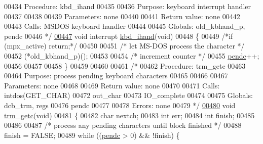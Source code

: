 \begin{DoxyCode}
00434 \textcolor{comment}{        Procedure: kbd\_ihand}
00435 \textcolor{comment}{}
00436 \textcolor{comment}{        Purpose: keyboard interrupt handler}
00437 \textcolor{comment}{}
00438 \textcolor{comment}{}
00439 \textcolor{comment}{        Parameters: none        }
00440 \textcolor{comment}{}
00441 \textcolor{comment}{        Return value: none}
00442 \textcolor{comment}{}
00443 \textcolor{comment}{        Calls:  MSDOS keyboard handler}
00444 \textcolor{comment}{}
00445 \textcolor{comment}{        Globals: old\_kbhand\_p, pendc}
00446 \textcolor{comment}{*/}
\hypertarget{trmdrive_8c_source_l00447}{}\hyperlink{trmdrive_8c_aebfcd164b5b67675c3d7f86be3f68e94}{00447} \textcolor{keywordtype}{void} interrupt \hyperlink{trmdrive_8c_aebfcd164b5b67675c3d7f86be3f68e94}{kbd_ihand}(\textcolor{keywordtype}{void})
00448 \{
00449         \textcolor{comment}{/*if (mpx\_active) return;*/}
00450 
00451         \textcolor{comment}{/* let MS-DOS process the character */}
00452         (*old\_kbhand\_p)();
00453 
00454         \textcolor{comment}{/* increment counter */}
00455         \hyperlink{trmdrive_8c_a152186ebee09ccf193037184a35ae013}{pendc}++;
00456 
00457 
00458 \}
00459 
00460 
00461 \textcolor{comment}{/*}
00462 \textcolor{comment}{        Procedure: trm\_getc}
00463 \textcolor{comment}{}
00464 \textcolor{comment}{        Purpose: process pending keyboard characters}
00465 \textcolor{comment}{}
00466 \textcolor{comment}{}
00467 \textcolor{comment}{        Parameters:     none    }
00468 \textcolor{comment}{}
00469 \textcolor{comment}{        Return value: none}
00470 \textcolor{comment}{}
00471 \textcolor{comment}{        Calls:  intdos(GET\_CHAR)}
00472 \textcolor{comment}{                out\_char}
00473 \textcolor{comment}{                IO\_complete}
00474 \textcolor{comment}{}
00475 \textcolor{comment}{        Globals: dcb\_trm, regs}
00476 \textcolor{comment}{                pendc}
00477 \textcolor{comment}{}
00478 \textcolor{comment}{        Errors: none}
00479 \textcolor{comment}{*/}
\hypertarget{trmdrive_8c_source_l00480}{}\hyperlink{trmdrive_8h_a0b41209d0a7740637f03d4033f9ac339}{00480} \textcolor{keywordtype}{void} \hyperlink{trmdrive_8c_a0b41209d0a7740637f03d4033f9ac339}{trm_getc}(\textcolor{keywordtype}{void})
00481 \{
00482         \textcolor{keywordtype}{char}    nextch;
00483         \textcolor{keywordtype}{int}     err;
00484         \textcolor{keywordtype}{int}     finish;
00485 
00486 
00487         \textcolor{comment}{/* process any pending characters until block finished */}
00488         finish = FALSE;
00489         \textcolor{keywordflow}{while} ((\hyperlink{trmdrive_8c_a152186ebee09ccf193037184a35ae013}{pendc} > 0) && !finish) \{

\end{DoxyCode}
